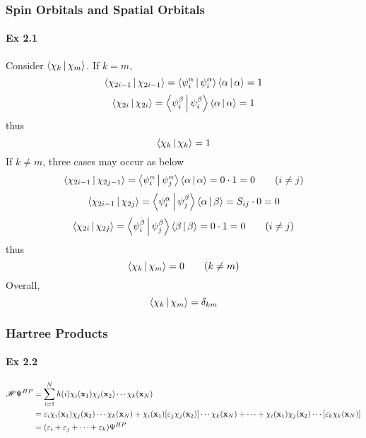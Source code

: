 \documentclass[a4paper]{article}
\newcommand{\ex}[1]{\paragraph{Ex #1}}
\numberwithin{equation}{subsection}
\begin{document}
\subsubsection{Spin Orbitals and Spatial Orbitals}
\ex{2.1}
Consider $ \Braket{\chi_k | \chi_m} $. If $ k=m $,
\begin{equation}\label{key}
\Braket{\chi_{2i-1} | \chi_{2i-1}} = \Braket{\psi_i^\alpha | \psi_i^\alpha} \Braket{\alpha|\alpha} = 1
\end{equation}
\begin{equation}\label{key}
\Braket{\chi_{2i} | \chi_{2i}} = \Braket{\psi_i^\beta | \psi_i^\beta} \Braket{\alpha|\alpha} = 1
\end{equation}
thus
\begin{equation}\label{key}
\Braket{\chi_k | \chi_k} = 1
\end{equation}
If $ k\neq m $, three cases may occur as below
\begin{equation}\label{key}
\Braket{\chi_{2i-1} | \chi_{2j-1}} = \Braket{\psi_i^\alpha | \psi_j^\alpha}\Braket{\alpha|\alpha} = 0\cdot 1 = 0 \qquad (i\neq j)
\end{equation}
\begin{equation}
\Braket{\chi_{2i-1} | \chi_{2j}} = \Braket{\psi_i^\alpha | \psi_j^\beta}\Braket{\alpha|\beta} = S_{ij}\cdot 0 = 0
\end{equation}
\begin{equation}\label{key}
\Braket{\chi_{2i} | \chi_{2j}} = \Braket{\psi_i^\beta | \psi_j^\beta}\Braket{\beta|\beta} = 0\cdot 1 = 0 \qquad (i\neq j)
\end{equation}
thus
\begin{equation}\label{key}
\Braket{\chi_k | \chi_m} = 0 \qquad (k\neq m)
\end{equation}
Overall,
\begin{equation}\label{key}
\Braket{\chi_k | \chi_m} = \delta_{km}
\end{equation}

\subsubsection{Hartree Products}
\ex{2.2}
\begin{equation}\label{key}
\begin{aligned}
\mathscr{H}\Psi^{HP} &= \sum_{i=1}^N h(i)\chi_i(\vb{x}_1)\chi_j(\vb{x}_2)\cdots\chi_k(\vb{x}_N)\\
&= \varepsilon_i\chi_i(\vb{x}_1)\chi_j(\vb{x}_2)\cdots\chi_k(\vb{x}_N) + \chi_i(\vb{x}_1)[\varepsilon_j\chi_j(\vb{x}_2)]\cdots\chi_k(\vb{x}_N) + \cdots + \chi_i(\vb{x}_1)\chi_j(\vb{x}_2)\cdots[\varepsilon_k\chi_k(\vb{x}_N)]\\
&= (\varepsilon_i +\varepsilon_j + \cdots + \varepsilon_k)\Psi^{HP}
\end{aligned}
\end{equation}
\end{document}
